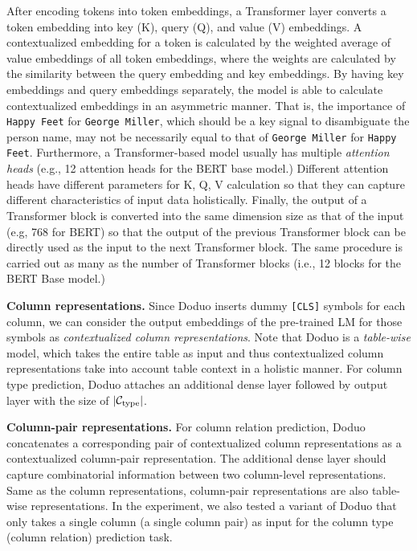 \documentclass[sigconf]{acmart}
\newcommand{\name}{\mbox{\sc Doduo}}
\begin{document}
After encoding tokens into token embeddings, a Transformer layer converts a token embedding into key (K), query (Q), and value (V) embeddings. A contextualized embedding for a token is calculated by the weighted average of value embeddings of all token embeddings, where the weights are calculated by the similarity between the query embedding and key embeddings. By having key embeddings and query embeddings separately, the model is able to calculate contextualized embeddings in an asymmetric manner. That is, the importance of {\tt Happy Feet} for {\tt George Miller}, which should be a key signal to disambiguate the person name, may not be necessarily equal to that of {\tt George Miller} for {\tt Happy Feet}. 
%
Furthermore, a Transformer-based model usually has multiple {\em attention heads} (e.g., 12 attention heads for the BERT base model.) Different attention heads have different parameters for K, Q, V calculation so that they can capture different characteristics of input data holistically. Finally, the output of a Transformer block is converted into the same dimension size as that of the input (e.g, 768 for BERT) so that the output of the previous Transformer block can be directly used as the input to the next Transformer block. 
%
The same procedure is carried out as many as the number of Transformer blocks (i.e., 12 blocks for the BERT Base model.)




\noindent
{\bf Column representations.}
Since \name{} inserts dummy {\tt [CLS]} symbols for each column, we can consider the output embeddings of the pre-trained LM for those symbols as {\em contextualized column representations}. Note that \name{} is a {\em table-wise} model, which takes the entire table as input and thus contextualized column representations take into account table context in a holistic manner.
%
For column type prediction, \name{} attaches an additional dense layer followed by output layer with the size of $|\mathcal{C}_{\rm type}|$. 


\noindent
{\bf Column-pair representations.} For column relation prediction, \name{} concatenates a corresponding pair of contextualized column representations as a contextualized column-pair representation.
%
The additional dense layer should capture combinatorial information between two column-level representations. Same as the column representations, column-pair representations are also table-wise representations.
%
In the experiment, we also tested a variant of \name{} that only takes a single column (a single column pair) as input for the column type (column relation) prediction task.
\end{document}
